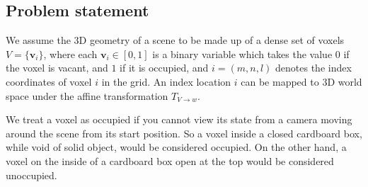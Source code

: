 \documentclass[10pt,twocolumn,letterpaper]{article}
\makeatletter
\renewcommand*{\ie}{i.e.\@\xspace}
\newcommand{\voxelgrid}{V}
\newcommand{\voxel}{\mathbf{v}}
\newcommand{\voxidx}{i}
\newcommand{\voxelidxs}{m, n, l}
\newcommand{\trans}{T}
\newcommand{\voxelgridtoworld}{\trans_{\voxelgrid \rightarrow w}}
\makeatother
\begin{document}





\subsection{Problem statement}

We assume the 3D geometry of a scene to be made up of a dense set of voxels $\voxelgrid = \{\voxel_\voxidx\}$, where each $\voxel_\voxidx \in [0, 1]$ is a binary variable which takes the value $0$ if the voxel is vacant, and $1$ if it is occupied, and $\voxidx = (\voxelidxs)$  denotes the index coordinates of voxel $\voxidx$ in the grid.
An index location $\voxidx$ can be mapped to 3D world space under the affine transformation $\voxelgridtoworld$.

We treat a voxel as occupied if you cannot view its state from a camera moving around the scene from its start position.
So a voxel inside a closed cardboard box, while void of solid object, would be considered occupied.
On the other hand, a voxel on the inside of a cardboard box open at the top would be considered unoccupied.
\end{document}
